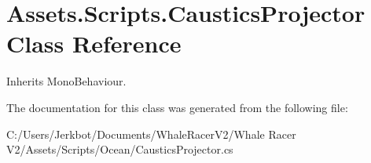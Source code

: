 \hypertarget{class_assets_1_1_scripts_1_1_caustics_projector}{}\section{Assets.\+Scripts.\+Caustics\+Projector Class Reference}
\label{class_assets_1_1_scripts_1_1_caustics_projector}


Inherits Mono\+Behaviour.



The documentation for this class was generated from the following file\+:\begin{DoxyCompactItemize}
\item 
C\+:/\+Users/\+Jerkbot/\+Documents/\+Whale\+Racer\+V2/\+Whale Racer V2/\+Assets/\+Scripts/\+Ocean/Caustics\+Projector.\+cs\end{DoxyCompactItemize}

